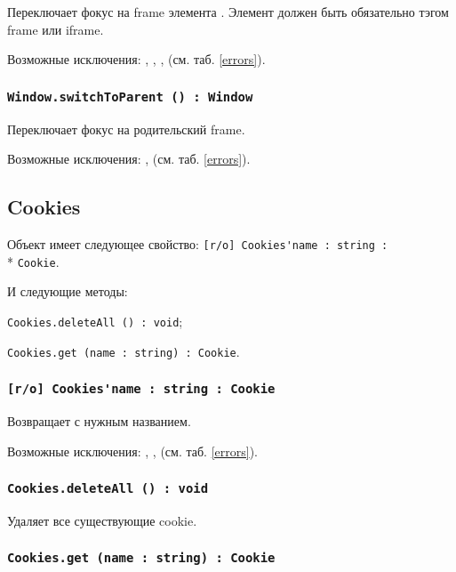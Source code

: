 Переключает фокус на frame элемента . Элемент должен быть обязательно тэгом frame или iframe.

Возможные исключения: , , ,  (см. таб. \ref{errors}).

\subsubsection{\lstinline|Window.switchToParent () : Window|}

Переключает фокус на родительский frame.

Возможные исключения: ,  (см. таб. \ref{errors}).

\subsection{{\color{orange} Cookies}}

Объект \cookies{} имеет следующее свойство: \lstinline|[r/o] Cookies'name : string :|\\* \lstinline|Cookie|.

И следующие методы: 
\begin{icItems}
	\item \lstinline|Cookies.deleteAll () : void|;
	\item \lstinline|Cookies.get (name : string) : Cookie|.
\end{icItems}

\subsubsection{\lstinline|[r/o] Cookies'name : string : Cookie|}

Возвращает \cookie{} с нужным названием.

Возможные исключения: , ,  (см. таб. \ref{errors}).

\subsubsection{\lstinline|Cookies.deleteAll () : void|}

Удаляет все существующие cookie.

\subsubsection{\lstinline|Cookies.get (name : string) : Cookie|}

